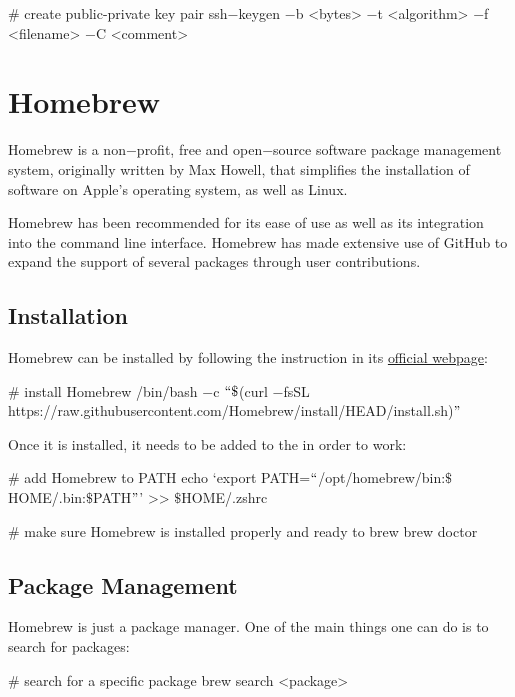 \begin{bash}
# create public-private key pair
ssh$-$keygen $-$b <bytes> $-$t <algorithm> $-$f <filename> $-$C <comment>
\end{bash}

\section{Homebrew}


\bd[Homebrew]
Homebrew is a non$-$profit, free and open$-$source software package management system, originally written by Max Howell,
that simplifies the installation of software on Apple's operating system, as well as Linux.
\ed

Homebrew has been
recommended for its ease of use as well as its integration into the command line interface. Homebrew has made extensive
use of GitHub to expand the support of several packages through user contributions.

\subsection{Installation}
Homebrew can be installed by following the instruction in its \href{https://brew.sh}{official webpage}:

\begin{bash}
# install Homebrew
/bin/bash $-$c $``\$$(curl $-$fsSL https://raw.githubusercontent.com/Homebrew/install/HEAD/install.sh)$"$
\end{bash}

Once it is installed, it needs to be added to the  in order to work:

\begin{bash}
# add Homebrew to PATH
echo `export PATH=$``$/opt/homebrew/bin:$\$${HOME}/.bin:$\$$PATH$"$' >> $\$$HOME/.zshrc
\end{bash}

\begin{bash}
# make sure Homebrew is installed properly and ready to brew
brew doctor
\end{bash}

\subsection{Package Management}
Homebrew is just a package manager. One of the main things one can do is to search for packages:

\begin{bash}
# search for a specific package
brew search <package>
\end{bash}

